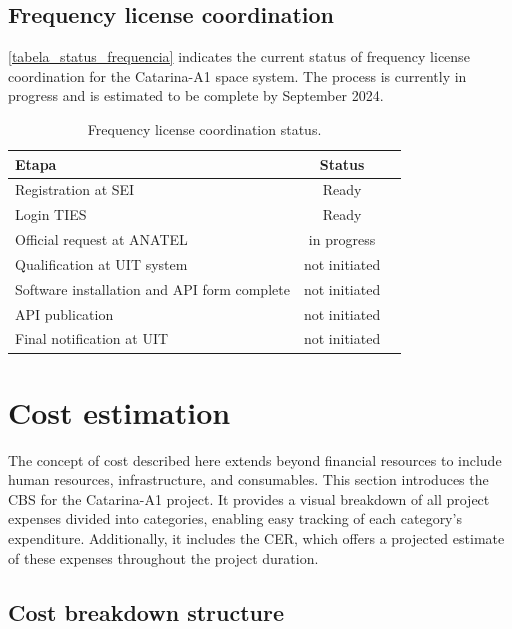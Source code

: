 \subsection{Frequency license coordination } \label{sec:frequency license coordination }

\autoref{tabela_status_frequencia} indicates the current status of frequency license coordination for the Catarina-A1 space system. The process is currently in progress and is estimated to be complete by September 2024.

\begin{table}[H]
    \centering
    \begin{tabular}{lcc}
        \toprule[1.5pt]
        \textbf{Etapa} & \textbf{Status} \\
        \midrule
        Registration at SEI                         & Ready \\
        Login TIES                                  & Ready \\
        Official request at ANATEL                  & in progress \\
        Qualification at UIT system                 & not initiated \\
        Software installation and API form complete & not initiated \\
        API publication                             & not initiated \\
        Final notification at UIT                   & not initiated \\
        \bottomrule[1.5pt]
    \end{tabular}
    \caption{Frequency license coordination status.}
    \label{tabela_status_frequencia}
\end{table}

\section{Cost estimation}

The concept of cost described here extends beyond financial resources to include human resources, infrastructure, and consumables.
This section introduces the \ac{CBS} for the Catarina-A1 project. It provides a visual breakdown of all project expenses divided into categories, enabling easy tracking of each category's expenditure. Additionally, it includes the \ac{CER}, which offers a projected estimate of these expenses throughout the project duration.

\subsection{Cost breakdown structure} \label{sec:cbs}

